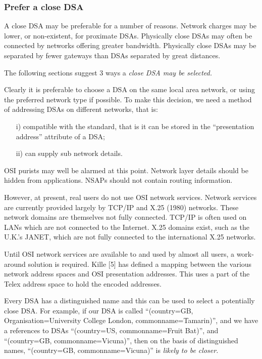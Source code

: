 \subsubsection{Prefer a close DSA}

A close DSA may be preferable for a number of reasons.
Network charges may be lower, or non-existent, for proximate DSAs.
Physically close DSAs may often be connected by networks offering greater
bandwidth.  Physically close DSAs may be separated by fewer gateways than
DSAs separated by great distances.

The following sections suggest 3 ways a 
\it
close
\rm
DSA may be selected.

Clearly it is preferable to choose a DSA on the same local area network, 
or using
the preferred network type if possible.
To make this decision, we need a method of addressing DSAs on different
networks, that is:
\begin{itemize}
\item[{i)}]
compatible with the standard, that is it can be stored in the ``presentation
address'' attribute of a DSA;
\item[{ii)}]
can supply sub network details.
\end{itemize}
OSI purists may well be alarmed at this point.  Network layer details should
be hidden from applications.  NSAPs should not contain routing information.

However, at present, real users do not use OSI network services. Network
services are currently provided largely by TCP/IP and X.25 (1980) networks.
These network domains are themselves not fully connected. TCP/IP is often
used on LANs which are not connected to the Internet. X.25 domains exist,
such as the U.K.'s JANET, which are not fully connected to the international
X.25 networks.

Until OSI network services are available to and used by almost all users, a
work-around solution is required.  Kille [5] has defined a mapping between
the various network address spaces and OSI presentation addresses.  This
uses a part of the Telex address space to hold the encoded addresses.

Every DSA has a distinguished name and this can be used to select a potentially
close DSA.
For example, if our DSA is called ``(country=GB, Organisation=University
College London, commonname=Tamarin)'', and 
we have a references to DSAs ``(country=US, commonname=Fruit Bat)'', and ``(country=GB, commonname=Vicuna)'',
then on the basis of distinguished names, ``(country=GB, commonname=Vicuna)''
is  
\it
likely
\rm
to be closer.


